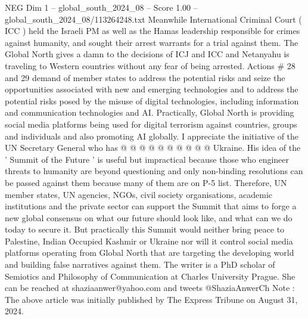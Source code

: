 \begin{textsample}{NEG Dim 1 – global\_south\_2024\_08 – Score 1.00 – global\_south\_2024\_08/113264248.txt}
Meanwhile International Criminal Court ( ICC ) held the Israeli PM as well as the Hamas leadership responsible for crimes against humanity, and sought their arrest warrants for a trial against them.
The Global North gives a damn to the decisions of ICJ and ICC and Netanyahu is traveling to Western countries without any fear of being arrested.
Actions \# 28 and 29 demand of member states to address the potential risks and seize the opportunities associated with new and emerging technologies and to address the potential risks posed by the misuse of digital technologies, including information and communication technologies and AI.
Practically, Global North is providing social media platforms being used for digital terrorism against countries, groups and individuals and also promoting AI globally.
I appreciate the initiative of the UN Secretary General who has @ @ @ @ @ @ @ @ @ @ Ukraine.
His idea of the ' Summit of the Future ' is useful but impractical because those who engineer threats to humanity are beyond questioning and only non-binding resolutions can be passed against them because many of them are on P-5 list.
Therefore, UN member states, UN agencies, NGOs, civil society organisations, academic institutions and the private sector can support the Summit that aims to forge a new global consensus on what our future should look like, and what can we do today to secure it.
But practically this Summit would neither bring peace to Palestine, Indian Occupied Kashmir or Ukraine nor will it control social media platforms operating from Global North that are targeting the developing world and building false narratives against them.
The writer is a PhD scholar of Semiotics and Philosophy of Communication at Charles University Prague.
She can be reached at shaziaanwer@yahoo.com and tweets @ShaziaAnwerCh Note : The above article was initially published by The Express Tribune on August 31, 2024.

\end{textsample}
